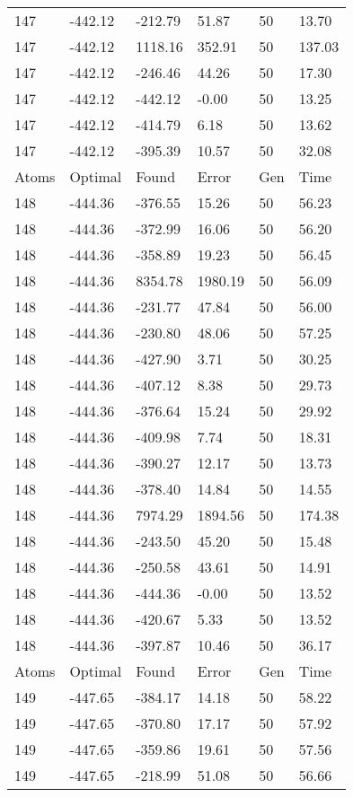\documentclass{report}
\begin{document}
\begin{appendix}
\begin{longtable}{llllll}
147 & -442.12 & -212.79 & 51.87 & 50 & 13.70 \\
147 & -442.12 & 1118.16 & 352.91 & 50 & 137.03 \\
147 & -442.12 & -246.46 & 44.26 & 50 & 17.30 \\
147 & -442.12 & -442.12 & -0.00 & 50 & 13.25 \\
147 & -442.12 & -414.79 & 6.18 & 50 & 13.62 \\
147 & -442.12 & -395.39 & 10.57 & 50 & 32.08 \\
Atoms & Optimal & Found & Error & Gen & Time \\
148 & -444.36 & -376.55 & 15.26 & 50 & 56.23 \\
148 & -444.36 & -372.99 & 16.06 & 50 & 56.20 \\
148 & -444.36 & -358.89 & 19.23 & 50 & 56.45 \\
148 & -444.36 & 8354.78 & 1980.19 & 50 & 56.09 \\
148 & -444.36 & -231.77 & 47.84 & 50 & 56.00 \\
148 & -444.36 & -230.80 & 48.06 & 50 & 57.25 \\
148 & -444.36 & -427.90 & 3.71 & 50 & 30.25 \\
148 & -444.36 & -407.12 & 8.38 & 50 & 29.73 \\
148 & -444.36 & -376.64 & 15.24 & 50 & 29.92 \\
148 & -444.36 & -409.98 & 7.74 & 50 & 18.31 \\
148 & -444.36 & -390.27 & 12.17 & 50 & 13.73 \\
148 & -444.36 & -378.40 & 14.84 & 50 & 14.55 \\
148 & -444.36 & 7974.29 & 1894.56 & 50 & 174.38 \\
148 & -444.36 & -243.50 & 45.20 & 50 & 15.48 \\
148 & -444.36 & -250.58 & 43.61 & 50 & 14.91 \\
148 & -444.36 & -444.36 & -0.00 & 50 & 13.52 \\
148 & -444.36 & -420.67 & 5.33 & 50 & 13.52 \\
148 & -444.36 & -397.87 & 10.46 & 50 & 36.17 \\
Atoms & Optimal & Found & Error & Gen & Time \\
149 & -447.65 & -384.17 & 14.18 & 50 & 58.22 \\
149 & -447.65 & -370.80 & 17.17 & 50 & 57.92 \\
149 & -447.65 & -359.86 & 19.61 & 50 & 57.56 \\
149 & -447.65 & -218.99 & 51.08 & 50 & 56.66 \\

\end{longtable}
\end{appendix}
\end{document}
